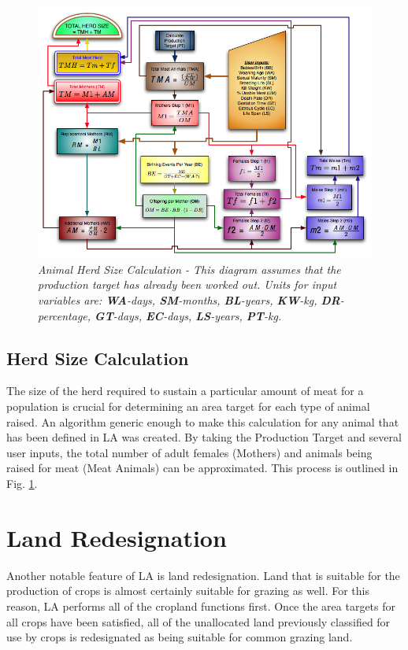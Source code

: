 \begin{figure}[htbp]
  \includegraphics[width=\textwidth]{./images/animalHerdSizeOrthogonal.jpg}
  \caption[Animal Herd Size Calculation]{\label{fig:herdSize}\textit{Animal
    Herd Size Calculation - This diagram assumes that the production target has
    already been worked out.  Units for input variables are: \textbf{WA}-days,
    \textbf{SM}-months, \textbf{BL}-years, \textbf{KW}-kg,
    \textbf{DR}-percentage, \textbf{GT}-days, \textbf{EC}-days,
    \textbf{LS}-years, \textbf{PT}-kg.}}
\end{figure}
  \subsection{Herd Size Calculation}
    The size of the herd required to sustain a particular amount of meat for a
    population is crucial for determining an area target for each type of animal
    raised.  An algorithm generic enough to make this calculation for any animal
    that has been defined in LA was created. By taking the Production
    Target and several user inputs, the total number of adult females (Mothers)
    and animals being raised for meat (Meat Animals) can be approximated. This
    process is outlined in Fig. \ref{fig:herdSize}.
\section{Land Redesignation}
  Another notable feature of LA is land redesignation.  Land that is suitable
  for the production of crops is almost certainly suitable for grazing as well. 
  For this reason, LA performs all of the cropland functions first.  Once the
  area targets for all crops have been satisfied, all of the unallocated land
  previously classified for use by crops is redesignated as being suitable for
  common grazing land. 
